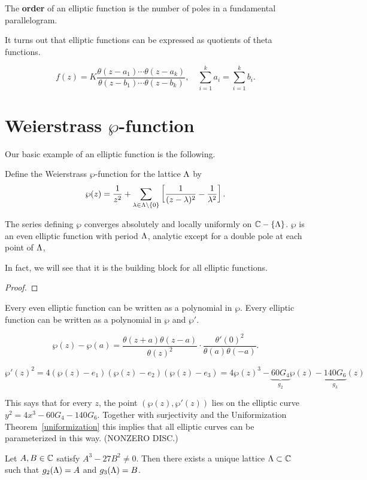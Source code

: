 \begin{df}
The \textbf{order} of an elliptic function is the number of poles in a fundamental parallelogram.
\end{df}
It turns out that elliptic functions can be expressed as quotients of theta functions.
\begin{thm}
\[
f(z)=K\frac{\theta(z-a_1)\cdots \theta(z-a_k)}{\theta(z-b_1)\cdots \theta(z-b_k)}, \quad \sum_{i=1}^k a_i=\sum_{i=1}^k b_i.
\]
\end{thm}
\section{Weierstrass $\wp$-function}
Our basic example of an elliptic function is the following.
\begin{df}
Define the Weierstrass $\wp$-function for the lattice $\Lambda$ by
\[
\wp(z)=\frac{1}{z^2}+\sum_{\lambda\in \Lambda\backslash\{0\}}\left[ {
\frac{1}{(z-\lambda)^2}-\frac{1}{\lambda^2}
} \right].
\]
\end{df}
\begin{pr}
The series defining $\wp$ converges absolutely and locally uniformly on $\mathbb{C}-\{\Lambda\}$. 
$\wp$ is an even elliptic function with period $\Lambda$, analytic except for a double pole at each point of $\Lambda$, 
\end{pr}
In fact, we will see that it is the building block for all elliptic functions.
\begin{proof}

\end{proof}
\begin{thm}
Every even elliptic function can be written as a polynomial in $\wp$. 
Every elliptic function can be written as a polynomial in $\wp$ and $\wp'$. 
\end{thm}
\begin{thm}
\[
\wp(z)-\wp(a)=\frac{\theta(z+a)\theta(z-a)}{\theta(z)^2} \cdot \frac{\theta'(0)^2}{\theta(a)\theta(-a)}.
\]
\end{thm}
\begin{thm}
\[
\wp'(z)^2=4(\wp(z)-e_1)(\wp(z)-e_2)(\wp(z)-e_3)
=4\wp(z)^3-\underbrace{60G_4}_{g_2}\wp(z)- \underbrace{140G_6}_{g_3}(z)
\]
\end{thm}
This says that for every $z$, the point $(\wp(z),\wp'(z))$ lies on the elliptic curve $y^2=4x^3-60G_4-140G_6$. Together with surjectivity and the Uniformization Theorem~\ref{uniformization} this implies that all elliptic curves can be parameterized in this way. (NONZERO DISC.)
\begin{thm}
Let $A,B\in \mathbb{C}$ satisfy $A^3-27B^2\ne 0$. Then there exists a unique lattice $\Lambda\subset \mathbb{C}$ such that $g_2(\Lambda)=A$ and $g_3(\Lambda)=B$.
\end{thm}
